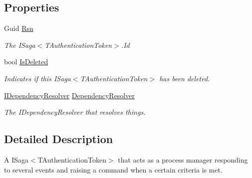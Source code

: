 \subsection*{Properties}
\begin{DoxyCompactItemize}
\item 
Guid \hyperlink{classCqrs_1_1Akka_1_1Tests_1_1Unit_1_1Sagas_1_1ConversationReportProcessManager_a86603fe9e9fa5e9b009064ea5ea6873a_a86603fe9e9fa5e9b009064ea5ea6873a}{Rsn}
\begin{DoxyCompactList}\small\item\em The I\+Saga$<$\+T\+Authentication\+Token$>$.\+Id \end{DoxyCompactList}\item 
bool \hyperlink{classCqrs_1_1Akka_1_1Tests_1_1Unit_1_1Sagas_1_1ConversationReportProcessManager_af7ab2e24d481f9f262b11eefd9b397bb_af7ab2e24d481f9f262b11eefd9b397bb}{Is\+Deleted}
\begin{DoxyCompactList}\small\item\em Indicates if this I\+Saga$<$\+T\+Authentication\+Token$>$ has been deleted. \end{DoxyCompactList}\item 
\hyperlink{interfaceCqrs_1_1Configuration_1_1IDependencyResolver}{I\+Dependency\+Resolver} \hyperlink{classCqrs_1_1Akka_1_1Tests_1_1Unit_1_1Sagas_1_1ConversationReportProcessManager_a6ddc3cab5bedf62389eaa4c769441aa8_a6ddc3cab5bedf62389eaa4c769441aa8}{Dependency\+Resolver}
\begin{DoxyCompactList}\small\item\em The I\+Dependency\+Resolver that resolves things. \end{DoxyCompactList}\end{DoxyCompactItemize}


\subsection{Detailed Description}
A I\+Saga$<$\+T\+Authentication\+Token$>$ that acts as a process manager responding to several events and raising a command when a certain criteria is met. 



